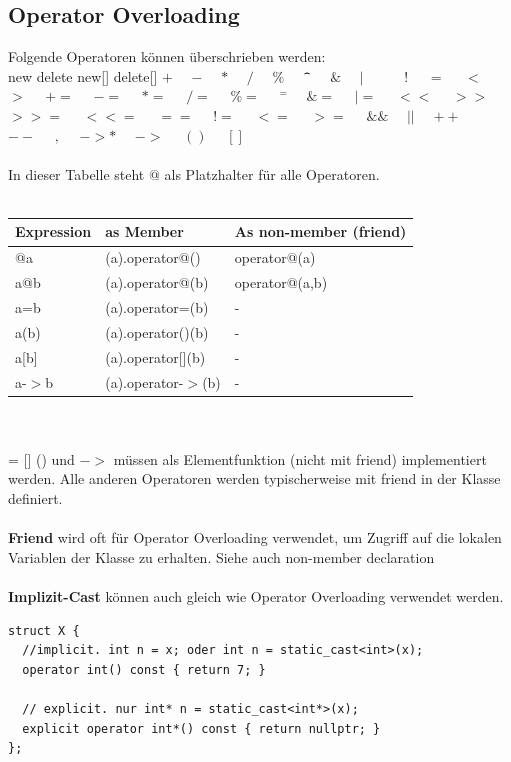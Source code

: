 \subsection{Operator Overloading}
Folgende Operatoren können überschrieben werden:\\
new delete new[] delete[] $+\quad$ $-\quad$ $*\quad$ $/\quad$ $\%\quad$ $\verb|^|\quad$ $\&\quad$ $|\quad$ $~\quad$ $!\quad$ $=\quad$ $<\quad$ $>\quad$ $+=\quad$ $-=\quad$ $*=\quad$ $/=\quad$ $\%=\quad$ $^=\quad$ $\&=\quad$ $|=\quad$ $<<\quad$ $>>\quad$ $>>=\quad$ $<<=\quad$ $==\quad$ $!=\quad$ $<=\quad$ $>=\quad$ $\&\&\quad$ $||\quad$ $++\quad$ $--\quad$ $,\quad$ $->*\quad$ $->\quad$ $( )\quad$ $[ ]$
~\\ ~\\
In dieser Tabelle steht $@$ als Platzhalter für alle Operatoren.\\ ~\\
\begin{tabular}{l|l|l}
	\textbf{Expression} & \textbf{as Member} & \textbf{As non-member} (friend) \\
	\toprule
	@a & (a).operator@() & operator@(a) \\
	a@b & (a).operator@(b) & operator@(a,b) \\
	a=b & (a).operator=(b) & - \\
	a(b) & (a).operator()(b) & - \\
	a[b] & (a).operator[](b) & - \\
	a-$>$b & (a).operator-$>$(b) & - \\
\end{tabular}
~\\ ~\\
\noindent
= [] () und $->$ müssen als Elementfunktion (nicht mit friend) implementiert werden. Alle anderen Operatoren werden typischerweise mit friend in der Klasse definiert.\\~\\





\noindent\textbf{Friend} wird oft für Operator Overloading verwendet, um Zugriff auf die lokalen Variablen der Klasse zu erhalten. Siehe auch non-member declaration\\ ~\\

\noindent\textbf{Implizit-Cast} können auch gleich wie Operator Overloading verwendet werden.
\begin{lstlisting}
struct X {
  //implicit. int n = x; oder int n = static_cast<int>(x);
  operator int() const { return 7; }
		
  // explicit. nur int* n = static_cast<int*>(x);
  explicit operator int*() const { return nullptr; }
};
\end{lstlisting}

